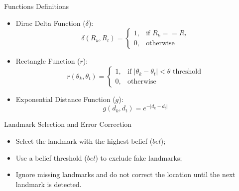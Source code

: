 \begin{frame}{Functions Definitions}
    \begin{itemize}
        \item Dirac Delta Function (\( \delta \)):
              \[
                  \delta(R_k, R_t) = \begin{cases}
                      1, & \text{if } R_k == R_t \\
                      0, & \text{otherwise}
                  \end{cases}
              \]
        \item Rectangle Function (\( r \)):
              \[
                  r(\theta_k, \theta_t) = \begin{cases}
                      1, & \text{if } |\theta_k - \theta_t| < \theta \text{ threshold} \\
                      0, & \text{otherwise}
                  \end{cases}
              \]
        \item Exponential Distance Function (\( g \)):
              \[
                  g(d_k, d_t) = e^{-|d_k - d_t|}
              \]
    \end{itemize}

\end{frame}

\begin{frame}{Landmark Selection and Error Correction}
    \begin{itemize}
        \item Select the landmark with the highest belief (\( bel \));\item Use a belief threshold (\( bel \)) to exclude fake landmarks;\item Ignore missing landmarks and do not correct the location until the next landmark is detected.\end{itemize}
\end{frame}